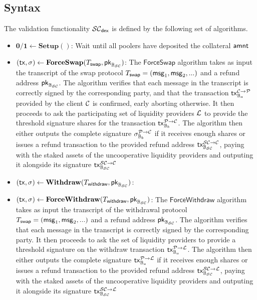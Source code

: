 \subsection{Syntax}
\begin{definition} The validation functionality $\mathcal{SC}_{\mathsf{dex}}$ is defined by the following set of algorithms.
\begin{itemize}[topsep=0pt, itemsep=0pt, leftmargin=2em]
    \item $\mathbf{0/1} \gets \mathbf{Setup}()$: Wait until all poolers have deposited the collateral $\mathsf{amnt}$
    \item $(\mathsf{tx}, \sigma) \gets \mathbf{ForceSwap}(T_\mathsf{swap}, \mathsf{pk}_{\mathbb{B}_{\mathcal{SC}}})$: The $\mathsf{ForceSwap}$ algorithm takes as input the transcript of the swap protocol $T_\mathsf{swap} = (\mathsf{msg}_1, \mathsf{msg}_2, ...)$ and a refund address $\mathsf{pk}_{\mathbb{B}_{\mathcal{SC}}}$. The algorithm verifies that each message in the transcript is correctly signed by the corresponding party, and that the transaction $\mathsf{tx}^{\mathcal{C} \rightarrow \mathcal{P}}_{\mathbb{B}_a}$ provided by the client $\mathcal{C}$ is confirmed, early aborting otherwise. It then proceeds to ask the participating set of liquidity providers $\mathcal{L}$ to provide the threshold signature shares for the transaction $\mathsf{tx}^{\mathcal{P} \rightarrow \mathcal{C}}_{\mathbb{B}_b}$. The algorithm then either outputs the complete signature $\sigma^{\mathcal{P} \rightarrow \mathcal{C}}_{\mathbb{B}_b}$ if it receives enough shares or issues a refund transaction to the provided refund address $\mathsf{tx}^{\mathcal{SC} \rightarrow \mathcal{C}}_{\mathbb{B}_{\mathcal{SC}}}$, paying with the staked assets of the uncooperative liquidity providers and outputing it alongside its signature $\mathsf{tx}^{\mathcal{SC} \rightarrow \mathcal{C}}_{\mathbb{B}_{\mathcal{SC}}}$
    \item $(\mathsf{tx}, \sigma) \gets \mathbf{Withdraw}(T_\mathsf{withdraw}, \mathsf{pk}_{\mathbb{B}_{\mathcal{SC}}})$:
    \item $(\mathsf{tx}, \sigma) \gets \mathbf{ForceWithdraw}(T_\mathsf{withdraw}, \mathsf{pk}_{\mathbb{B}_{\mathcal{SC}}})$: The $\mathsf{ForceWithdraw}$ algorithm takes as input the transcript of the withdrawal protocol $T_\mathsf{swap} = (\mathsf{msg}_1, \mathsf{msg}_2, ...)$ and a refund address $\mathsf{pk}_{\mathbb{B}_{\mathcal{SC}}}$. The algorithm verifies that each message in the transcript is correctly signed by the corresponding party. It then proceeds to ask the set of liquidity providers to provide a threshold signature on the withdraw transaction $\mathsf{tx}^{\mathcal{P} \rightarrow \mathcal{L}}_{\mathbb{B}_a}$.  The algorithm then either outputs the complete signature $\mathsf{tx}^{\mathcal{P} \rightarrow \mathcal{L}}_{\mathbb{B}_a}$ if it receives enough shares or issues a refund transaction to the provided refund address $\mathsf{tx}^{\mathcal{SC} \rightarrow \mathcal{L}}_{\mathbb{B}_{\mathcal{SC}}}$, paying with the staked assets of the uncooperative liquidity providers and outputing it alongside its signature $\mathsf{tx}^{\mathcal{SC} \rightarrow \mathcal{L}}_{\mathbb{B}_{\mathcal{SC}}}$

\end{itemize}
\end{definition}
